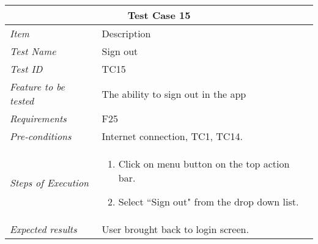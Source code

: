 \begin{minipage}{\linewidth}
\setlength{\tabcolsep}{15pt}
\centering
{}
\begin{tabular}{ |l|p{70mm}| }
	\hline
	\multicolumn{2}{|c|}{\cellcolor{gray!25} \textbf{Test Case 15}} \\
	\hline
	\it{\cellcolor{gray!25}Item} & {\cellcolor{gray!25} Description } \\
	\hline
	\it{\cellcolor{gray!25}Test Name } & Sign out \\ \hline
	\it{\cellcolor{gray!25}Test ID} & TC15 \\ \hline
	\it{\cellcolor{gray!25}Feature to be tested} & The ability to sign out in the app \\ \hline
	\it{\cellcolor{gray!25}Requirements} & F25  \\ \hline
	\it{\cellcolor{gray!25}Pre-conditions} & Internet connection, TC1, TC14. \\ \hline
	\it{\cellcolor{gray!25}Steps of Execution} & \begin{enumerate}
	                                       \item Click on menu button on the top action bar. 
	                                       \item Select ``Sign out" from the drop down list.
	                                     \end{enumerate} \\ \hline
	\it{\cellcolor{gray!25}Expected results} & User brought back to login screen. \\
	\hline
\end{tabular}
\medskip
\end{minipage}
%
